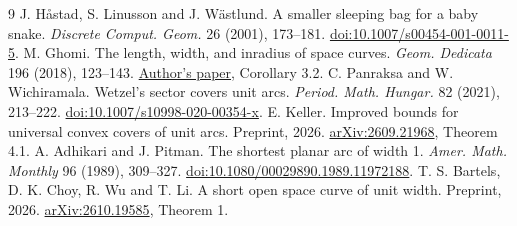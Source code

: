 \documentclass[11pt,letterpaper]{article}
\begin{document}
\vspace{4pt}
\begingroup\small
\renewcommand{\refname}{Sources}
\begin{thebibliography}{9}\setlength{\itemsep}{3pt}\setlength{\parskip}{0pt}
 J. H\aa stad, S. Linusson and J. W\"astlund. A smaller sleeping bag for a baby snake. \emph{Discrete Comput. Geom.} 26 (2001), 173--181.
\href{https://doi.org/10.1007/s00454-001-0011-5}{doi:10.1007/s00454-001-0011-5}.
 M. Ghomi. The length, width, and inradius of space curves. \emph{Geom. Dedicata} 196 (2018), 123--143. \href{https://ghomi.math.gatech.edu/Papers/inradius.pdf}{Author's paper}, Corollary 3.2.
 C. Panraksa and W. Wichiramala. Wetzel's sector covers unit arcs. \emph{Period. Math. Hungar.} 82 (2021), 213--222. \href{https://doi.org/10.1007/s10998-020-00354-x}{doi:10.1007/s10998-020-00354-x}.
 E. Keller. Improved bounds for universal convex covers of unit arcs. Preprint, 2026. \href{https://arxiv.org/abs/2609.21968}{arXiv:2609.21968}, Theorem 4.1.
 A. Adhikari and J. Pitman. The shortest planar arc of width 1.
\emph{Amer. Math. Monthly} 96 (1989), 309--327. \href{https://doi.org/10.1080/00029890.1989.11972188}{doi:10.1080/00029890.1989.11972188}.
 T. S. Bartels, D. K. Choy, R. Wu and T. Li. A short open space curve of unit width. Preprint, 2026. \href{https://arxiv.org/abs/2610.19585}{arXiv:2610.19585}, Theorem 1.
\end{thebibliography}
\endgroup
\end{document}
